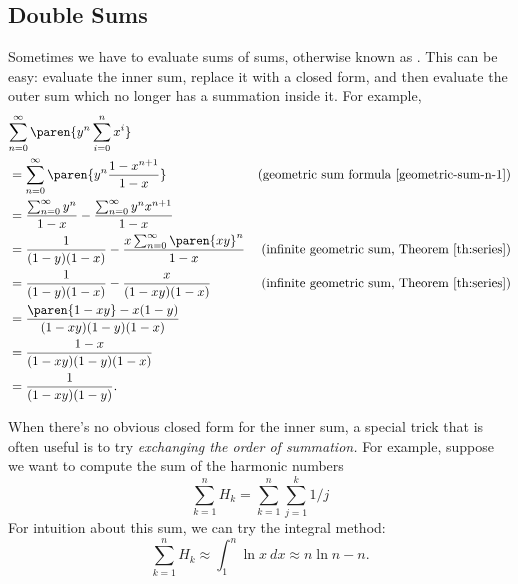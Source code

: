 \subsection{Double Sums}

Sometimes we have to evaluate sums of sums, otherwise known as
.  This can be easy: evaluate the inner
sum, replace it with a closed form, and then evaluate the outer sum which
no longer has a summation inside it.  For example,
\begin{align*}
\lefteqn{\sum_{n=0}^{\infty} \paren{y^n \sum_{i=0}^n x^i}}\\
 & = \sum_{n=0}^{\infty} \paren{y^n \frac{1-x^{n+1}}{1-x}}
     & \text{(geometric sum formula~\eqref{geometric-sum-n-1})}\\
 & = \frac{\sum_{n=0}^{\infty} y^n}{1-x} - \frac{\sum_{n=0}^{\infty} y^nx^{n+1}}{1-x}\\
 & = \frac{1}{(1-y)(1-x)} - \frac{x\sum_{n=0}^{\infty} \paren{xy}^n}{1-x}
      & \text{(infinite geometric sum, Theorem~\ref{th:series})}\\
 & = \frac{1}{(1-y)(1-x)} - \frac{x}{(1-xy)(1-x)}
      & \text{(infinite geometric sum, Theorem~\ref{th:series})}\\
  & = \frac{\paren{1-xy} - x(1-y)}{(1-xy)(1-y)(1-x)}\\
  & = \frac{1-x}{(1-xy)(1-y)(1-x)}\\
  & = \frac{1}{(1-xy)(1-y)}.
\end{align*}

When there's no obvious closed form for the inner sum, a special trick
that is often useful is to try \emph{exchanging the order of summation.}
For example, suppose we want to compute the sum of the harmonic numbers
\[
\sum_{k=1}^n H_k = \sum_{k=1}^n \sum_{j=1}^k 1/j
\]
For intuition about this sum, we can try the integral method:
\[
\sum_{k=1}^n H_k \approx \int_{1}^n \ln x \ dx \approx n\ln n-n.
\]

